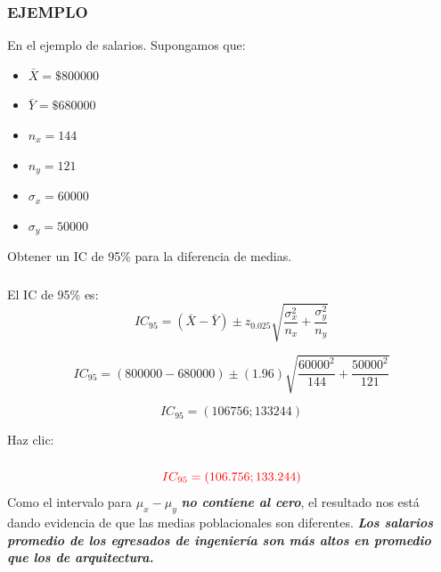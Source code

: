 \documentclass{beamer}
\begin{document}
\begin{frame}
\frametitle{EJEMPLO}

En el ejemplo de salarios. Supongamos que:
\begin{itemize}
\item $\bar{X}=\$800000$
\item $\bar{Y}=\$680000$
\item $n_x=144$
\item $n_y=121$
\item $\sigma_x=60000$
\item $\sigma_y=50000$
\end{itemize}
Obtener un IC de 95\% para la diferencia de medias.
\end{frame}

\begin{frame}
\frametitle{}

El IC de 95\% es:
$$IC_{95}=(\bar{X}-\bar{Y}) \pm z_{0.025}\sqrt{\frac{\sigma_x^2}{n_x}+\frac{\sigma_y^2}{n_y}}$$

$$IC_{95}=(800000-680000)\pm(1.96)\sqrt{\frac{60000^2}{144}+\frac{50000^2}{121}}$$

$$IC_{95}=(106756; 133244)$$

      Haz clic: \href{https://colab.research.google.com/drive/14izMe-eFdclOhTeS3hiLE_0h_4E3Jkps?usp=sharing}{}  \href{https://docs.google.com/spreadsheets/d/1xAh-TitIncHH8uwblbpvgjYma7B6gUTWlk8C2z1BquQ/edit?usp=sharing}{}
\end{frame}


\begin{frame}
\frametitle{}

$$\color{red}{IC_{95}=(106.756; 133.244)}$$
Como el intervalo para $\mu_x-\mu_y$ \emph{\textbf{no contiene al cero}}, el resultado nos está dando evidencia de que las medias poblacionales son diferentes. \emph{\textbf{Los salarios promedio de los egresados de ingeniería son más altos en promedio que los de arquitectura.}}
\end{frame}
\end{document}
